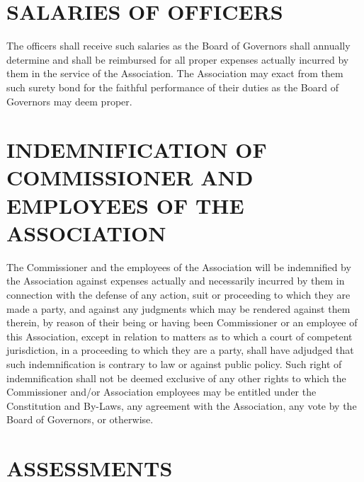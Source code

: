 \documentclass[]{book}
\begin{document}
\hypertarget{salaries-of-officers}{%
\section{SALARIES OF OFFICERS}\label{salaries-of-officers}}

The officers shall receive such salaries as the Board of Governors shall annually determine and shall be reimbursed for all proper expenses actually incurred by them in the service of the Association. The Association may exact from them such surety bond for the faithful performance of their duties as the Board of Governors may deem proper.

\hypertarget{indemnification-of-commissioner-and-employees-of-the-association}{%
\section{INDEMNIFICATION OF COMMISSIONER AND EMPLOYEES OF THE ASSOCIATION}\label{indemnification-of-commissioner-and-employees-of-the-association}}

The Commissioner and the employees of the Association will be indemnified by the Association against expenses actually and necessarily incurred by them in connection with the defense of any action, suit or proceeding to which they are made a party, and against any judgments which may be rendered against them therein, by reason of their being or having been Commissioner or an employee of this Association, except in relation to matters as to which a court of competent jurisdiction, in a proceeding to which they are a party, shall have adjudged that such indemnification is contrary to law or against public policy. Such right of indemnification shall not be deemed exclusive of any other rights to which the Commissioner and/or Association employees may be entitled under the Constitution and By-Laws, any agreement with the Association, any vote by the Board of Governors, or otherwise.

\hypertarget{assessments}{%
\section{ASSESSMENTS}\label{assessments}}
\end{document}
